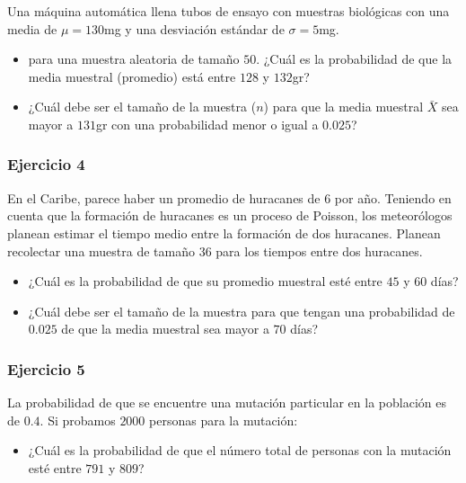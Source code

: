 \documentclass[
]{book}
\providecommand{\tightlist}{%
  \setlength{\itemsep}{0pt}\setlength{\parskip}{0pt}}
\begin{document}
Una máquina automática llena tubos de ensayo con muestras biológicas con una media de \(\mu=130\)mg y una desviación estándar de \(\sigma=5\)mg.

\begin{itemize}
\item
  para una muestra aleatoria de tamaño \(50\). ¿Cuál es la probabilidad de que
  la media muestral (promedio) está entre \(128\) y \(132\)gr?
\item
  ¿Cuál debe ser el tamaño de la muestra (\(n\)) para que la media muestral \(\bar{X}\) sea mayor a \(131\)gr con una probabilidad menor o igual a \(0.025\)?
\end{itemize}

\hypertarget{ejercicio-4-3}{%
\subsubsection{Ejercicio 4}\label{ejercicio-4-3}}

En el Caribe, parece haber un promedio de huracanes de \(6\) por año. Teniendo en cuenta que la formación de huracanes es un proceso de Poisson, los meteorólogos planean estimar el tiempo medio entre la formación de dos huracanes. Planean recolectar una muestra de tamaño \(36\) para los tiempos entre dos huracanes.

\begin{itemize}
\item
  ¿Cuál es la probabilidad de que su promedio muestral esté entre \(45\) y \(60\) días?
\item
  ¿Cuál debe ser el tamaño de la muestra para que tengan una probabilidad de \(0.025\) de que la media muestral sea mayor a \(70\) días?
\end{itemize}

\hypertarget{ejercicio-5-2}{%
\subsubsection{Ejercicio 5}\label{ejercicio-5-2}}

La probabilidad de que se encuentre una mutación particular en la población es de \(0.4\). Si probamos \(2000\) personas para la mutación:

\begin{itemize}
\tightlist
\item
  ¿Cuál es la probabilidad de que el número total de personas con la mutación esté entre \(791\) y \(809\)?
\end{itemize}
\end{document}
